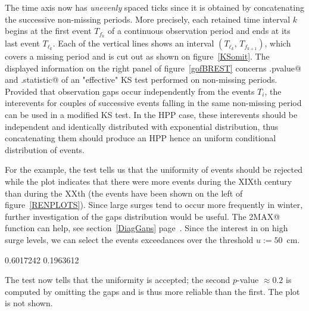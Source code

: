 \documentclass[a4paper]{report}
\begin{document}
\noindent
The time axis now has \textit{unevenly} spaced ticks since it is
obtained by concatenating the successive non-missing periods. More
precisely, each retained time interval $k$ begins at the first event
$T_{f_k}$ of a continuous observation period and ends at its last
event $T_{\ell_k}$. Each of the vertical lines shows an
interval $(T_{\ell_k},\,T_{f_{k+1}})$, which covers a missing period
and is cut out as shown on figure~\ref{KSomit}.  The displayed
information on the right panel of figure~\ref{gofBREST} concerns
\verb@effKS.pvalue@ and \verb@effKS.statistic@ of an "effective" KS
test performed on non-missing periods.  Provided that observation gaps
occur independently from the events $T_i$, the interevents for couples
of successive events falling in the same non-missing period can be
used in a modified KS test. In the HPP case, these interevents should
be independent and identically distributed with exponential
distribution, thus concatenating them should produce an HPP hence an
uniform conditional distribution of events.

For the \verb@Brest@ example, the test tells us that the uniformity of
events should be rejected while the plot indicates that there were
more events during the XIXth century than during the XXth
(the events have been shown on the left of figure~\ref{RENPLOTS}). Since
large surges tend to occur more frequently in winter, further
investigation of the gaps distribution would be useful. The
\verb@OT2MAX@ function can help, see section~\ref{DiagGaps}
page~\pageref{DiagGaps}. Since the interest in on high surge levels,
we can select the events exceedances over the threshold $u:=50$~cm.

\begin{Schunk}
\begin{Soutput}
[1] 0.6017242 0.1963612
\end{Soutput}
\end{Schunk}

\noindent
The test now tells that the uniformity is accepted; the second $p$-value
$$
is computed by omitting the gaps and is thus more reliable than the first.
The plot is not shown.
\end{document}

